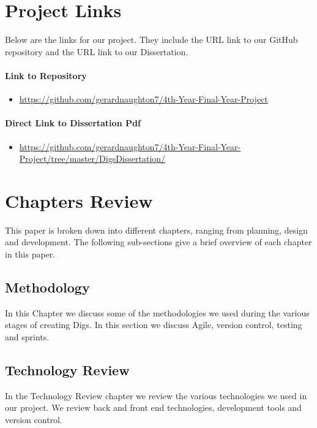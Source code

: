 \section{Project Links}
Below are the links for our project. They include the URL link to our GitHub repository and the URL link to our Dissertation.

\paragraph{Link to Repository}
\begin{itemize}
\item \href{https://github.com/gerardnaughton7/4th-Year-Final-Year-Project}{https://github.com/gerardnaughton7/4th-Year-Final-Year-Project} 
\end{itemize}

\paragraph{Direct Link to Dissertation Pdf}
\begin{itemize}
    \item \href{https://github.com/gerardnaughton7/4th-Year-Final-Year-Project/tree/master/DigsDissertation/}{https://github.com/gerardnaughton7/4th-Year-Final-Year-Project/tree/master/DigsDissertation/}
\end{itemize}

\section{Chapters Review}
This paper is broken down into different chapters, ranging from planning, design and development. The following sub-sections give a brief overview of each chapter in this paper.

\subsection{Methodology}
In this Chapter we discuss some of the methodologies we used during the various stages of creating Digs. In this section we discuss Agile, version control, testing and sprints.

\subsection{Technology Review}
In the Technology Review chapter we review the various technologies we used in our project. We review back and front end technologies, development tools and version control.

